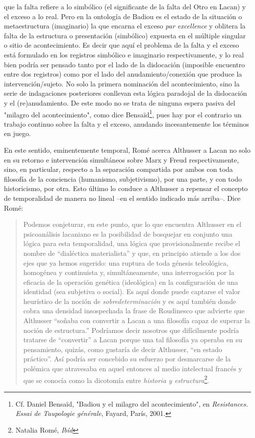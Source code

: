 \documentclass{book}
\begin{document}
que la falta refiere a lo simbólico (el significante de la falta del
Otro en Lacan) y el exceso a lo real. Pero en la ontología de Badiou es
el estado de la situación o metaestructura (imaginario) la que encarna
el exceso \emph{par excellence} y oblitera la falta de la estructura o
presentación (simbólico) expuesta en el múltiple singular o sitio de
acontecimiento. Es decir que aquí el problema de la falta y el exceso
está formulado en los registros simbólico e imaginario respectivamente,
y lo real bien podría ser pensado tanto por el lado de la dislocación
(imposible encuentro entre dos registros) como por el lado del
anudamiento/conexión que produce la intervención/sujeto. No solo la
primera nominación del acontecimiento, sino la serie de indagaciones
posteriores conllevan esta lógica paradojal de la dislocación y el
(re)anudamiento. De este modo no se trata de ninguna espera pasiva del
"milagro del acontecimiento", como dice Bensaïd\footnote{Cf. Daniel
  Bensaïd, "Badiou y el milagro del acontecimiento", en
  \emph{Resistances. Essai de Taupologie générale}, Fayard, París, 2001.},
pues hay por el contrario un trabajo continuo sobre la falta y el
exceso, anudando incesantemente los términos en juego.

En este sentido, eminentemente temporal, Romé acerca Althusser a Lacan
no solo en su retorno e intervención simultáneos sobre Marx y Freud
respectivamente, sino, en particular, respecto a la separación
compartida por ambos con toda filosofía de la conciencia (humanismo,
subjetivismo), por una parte, y con todo historicismo, por otra. Esto
último lo conduce a Althusser a repensar el concepto de temporalidad de
manera no lineal --en el sentido indicado más arriba--. Dice Romé:

\begin{quote}
Podemos conjeturar, en este punto, que lo que encuentra Althusser en el
psicoanálisis lacaniano es la posibilidad de bosquejar en conjunto una
lógica para esta temporalidad, una lógica que provisionalmente recibe el
nombre de ``dialéctica materialista'' y que, en principio atiende a los
dos ejes que ya hemos sugerido: una ruptura de toda génesis teleológica,
homogénea y continuista y, simultáneamente, una interrogación por la
eficacia de la operación genética (ideológica) en la configuración de
una identidad (sea subjetiva o social). Es aquí donde puede captarse el
valor heurístico de la noción de \emph{sobredeterminación} y es aquí
también donde cobra una densidad insospechada la frase de Roudinesco que
advierte que Althusser ``soñaba con convertir a Lacan a una filosofía
capaz de superar la noción de estructura.'' Podríamos decir nosotros que
difícilmente podría tratarse de ``convertir'' a Lacan porque una tal
filosofía ya operaba en su pensamiento, quizás, como gustaría de decir
Althusser, ``en estado práctico''. Así podría ser concebido su esfuerzo
por desmarcarse de la polémica que atravesaba en aquel entonces al medio
intelectual francés y que se conocía como la dicotomía entre
\emph{historia y estructura}\footnote{Natalia Romé, \emph{Ibíd}}.
\end{quote}
\end{document}

